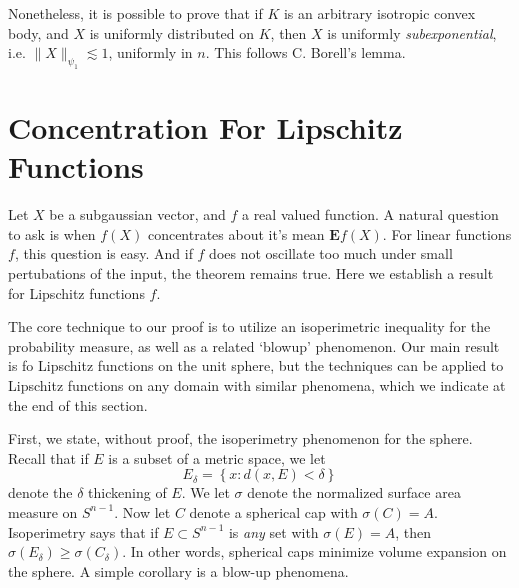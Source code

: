 Nonetheless, it is possible to prove that if $K$ is an arbitrary isotropic convex body, and $X$ is uniformly distributed on $K$, then $X$ is uniformly {\it subexponential}, i.e. $\| X \|_{\psi_1} \lesssim 1$, uniformly in $n$. This follows C. Borell's lemma.









\section{Concentration For Lipschitz Functions}

Let $X$ be a subgaussian vector, and $f$ a real valued function. A natural question to ask is when $f(X)$ concentrates about it's mean $\mathbf{E} f(X)$. For linear functions $f$, this question is easy. And if $f$ does not oscillate too much under small pertubations of the input, the theorem remains true. Here we establish a result for Lipschitz functions $f$.

The core technique to our proof is to utilize an isoperimetric inequality for the probability measure, as well as a related `blowup' phenomenon. Our main result is fo Lipschitz functions on the unit sphere, but the techniques can be applied to Lipschitz functions on any domain with similar phenomena, which we indicate at the end of this section.

First, we state, without proof, the isoperimetry phenomenon for the sphere. Recall that if $E$ is a subset of a metric space, we let
%
\[ E_\delta = \left\{ x : d(x,E) < \delta \right\} \]
%
denote the $\delta$ thickening of $E$. We let $\sigma$ denote the normalized surface area measure on $S^{n-1}$. Now let $C$ denote a spherical cap with $\sigma(C) = A$. Isoperimetry says that if $E \subset S^{n-1}$ is {\it any} set with $\sigma(E) = A$, then $\sigma(E_\delta) \geq \sigma(C_\delta)$. In other words, spherical caps minimize volume expansion on the sphere. A simple corollary is a blow-up phenomena.


